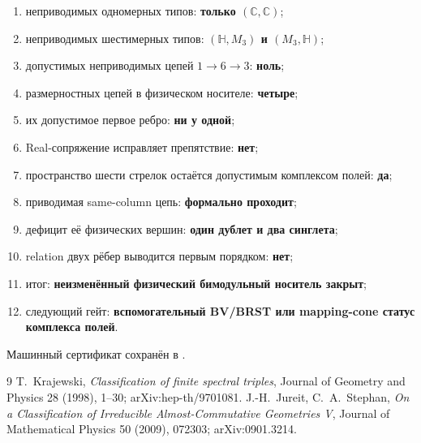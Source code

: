 \begin{protocol}
\begin{enumerate}
 \item неприводимых одномерных типов: \textbf{только $(\mathbb C,\mathbb C)$};
 \item неприводимых шестимерных типов:
 \textbf{$(\mathbb H,M_3)$ и $(M_3,\mathbb H)$};
 \item допустимых неприводимых цепей $1\to6\to3$: \textbf{ноль};
 \item размерностных цепей в физическом носителе: \textbf{четыре};
 \item их допустимое первое ребро: \textbf{ни у одной};
 \item Real-сопряжение исправляет препятствие: \textbf{нет};
 \item пространство шести стрелок остаётся допустимым комплексом полей:
 \textbf{да};
 \item приводимая same-column цепь: \textbf{формально проходит};
 \item дефицит её физических вершин:
 \textbf{один дублет и два синглета};
 \item relation двух рёбер выводится первым порядком: \textbf{нет};
 \item итог:
 \textbf{неизменённый физический бимодульный носитель закрыт};
 \item следующий гейт:
 \textbf{вспомогательный BV/BRST или mapping-cone статус комплекса полей}.
\end{enumerate}
\end{protocol}

Машинный сертификат сохранён в
.

\begin{thebibliography}{9}
T.~Krajewski,
\emph{Classification of finite spectral triples},
Journal of Geometry and Physics 28 (1998), 1--30;
arXiv:hep-th/9701081.
J.-H.~Jureit, C.~A.~Stephan,
\emph{On a Classification of Irreducible Almost-Commutative Geometries V},
Journal of Mathematical Physics 50 (2009), 072303; arXiv:0901.3214.
\end{thebibliography}